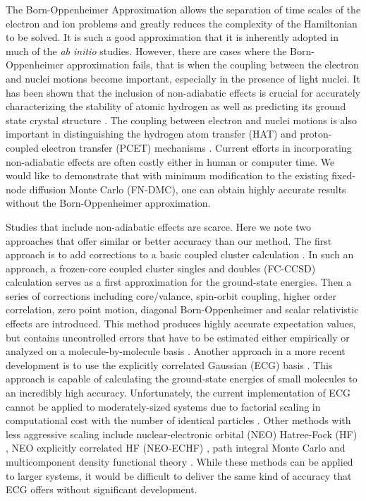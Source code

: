 The Born-Oppenheimer Approximation\cite{BO} allows the separation of time scales of the electron and ion problems and greatly reduces the complexity of the Hamiltonian to be solved. It is such a good approximation that it is inherently adopted in much of the \textit{ab initio} studies. However, there are cases where the Born-Oppenheimer approximation fails, that is when the coupling between the electron and nuclei motions become important, especially in the presence of light nuclei. It has been shown that the inclusion of non-adiabatic effects is crucial for accurately characterizing the stability of atomic hydrogen as well as predicting its ground state crystal structure \cite{Ceperley_1987,Natoli_1993,Natoli_1995}. The coupling between electron and nuclei motions is also important in distinguishing the hydrogen atom transfer (HAT) and proton-coupled electron transfer (PCET) mechanisms \cite{Sirjoosingh_PCET}. Current efforts in incorporating  non-adiabatic effects are often costly either in human or computer time. We would like to demonstrate that with minimum modification \cite{Tubman_ECG} to the existing fixed-node diffusion Monte Carlo (FN-DMC), one can obtain highly accurate results without the Born-Oppenheimer approximation.

Studies that include non-adiabatic effects are scarce. Here we note two approaches that offer similar or better accuracy than our method. The first approach is to add corrections to a basic coupled cluster calculation \cite{Feller_Corrections}. In such an approach, a frozen-core coupled cluster singles and doubles (FC-CCSD) \cite{Purvis_CCSD} calculation serves as a first approximation for the ground-state energies. Then a series of corrections including core/valance, spin-orbit coupling, higher order correlation, zero point motion, diagonal Born-Oppenheimer and scalar relativistic effects are introduced. This method produces highly accurate expectation values, but contains uncontrolled errors that have to be estimated either empirically or analyzed on a molecule-by-molecule basis \cite{Feller_Error}. Another approach in a more recent development is to use the explicitly correlated Gaussian (ECG) basis \cite{Adamowicz_ECG,Mitroy_ECG}. This approach is capable of calculating the ground-state energies of small molecules to an incredibly high accuracy. Unfortunately, the current implementation of ECG cannot be applied to moderately-sized systems due to factorial scaling in computational cost with the number of identical particles \cite{Bubin_BH_noBO}. Other methods with less aggressive scaling include nuclear-electronic orbital (NEO) Hatree-Fock (HF) \cite{Sharon_NEO}, NEO explicitly correlated HF (NEO-ECHF) \cite{Sharon_NEOX,Sharon_NEOX1,Sharon_NEOX2}, path integral Monte Carlo \cite{Ilkka_Path,Ilkka_Path1,Ilkka_Path2} and multicomponent density functional theory \cite{Sharon_NEO-DFT,Sharon_NEO-DFT1,Sharon_NEO-DFT2,Sharon_NEO-DFT3,Gross_NEO-DFT,Gross_NEO-DFT1}. While these methods can be applied to larger systems, it would be difficult to deliver the same kind of accuracy that ECG offers without significant development.

